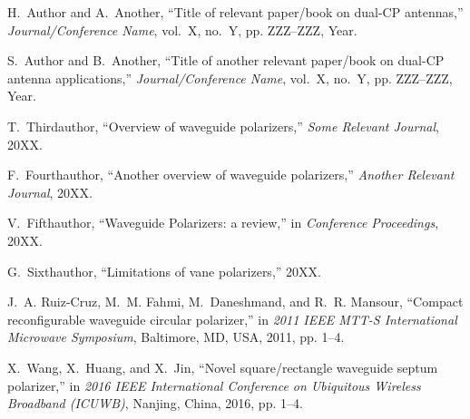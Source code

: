 \documentclass[lettersize,journal]{IEEEtran}
\begin{document}
\begin{thebibliography}{1}
    
    H.~Author and A.~Another, ``Title of relevant paper/book on dual-CP antennas,'' \emph{Journal/Conference Name}, vol.~X, no.~Y, pp. ZZZ--ZZZ, Year.
    
    S.~Author and B.~Another, ``Title of another relevant paper/book on dual-CP antenna applications,'' \emph{Journal/Conference Name}, vol.~X, no.~Y, pp. ZZZ--ZZZ, Year.
    
    T.~Thirdauthor, ``Overview of waveguide polarizers,'' \emph{Some Relevant Journal}, 20XX.
    
    F.~Fourthauthor, ``Another overview of waveguide polarizers,'' \emph{Another Relevant Journal}, 20XX.
    
    V.~Fifthauthor, ``Waveguide Polarizers: a review,'' in \emph{Conference Proceedings}, 20XX.
    
    G.~Sixthauthor, ``Limitations of vane polarizers,'' 20XX.
    
    J.~A. Ruiz-Cruz, M.~M. Fahmi, M.~Daneshmand, and R.~R. Mansour, ``Compact reconfigurable waveguide circular polarizer,'' in \emph{2011 IEEE MTT-S International Microwave Symposium}, Baltimore, MD, USA, 2011, pp. 1--4.
    
    X.~Wang, X.~Huang, and X.~Jin, ``Novel square/rectangle waveguide septum polarizer,'' in \emph{2016 IEEE International Conference on Ubiquitous Wireless Broadband (ICUWB)}, Nanjing, China, 2016, pp. 1--4.
    

\end{thebibliography}
\end{document}
